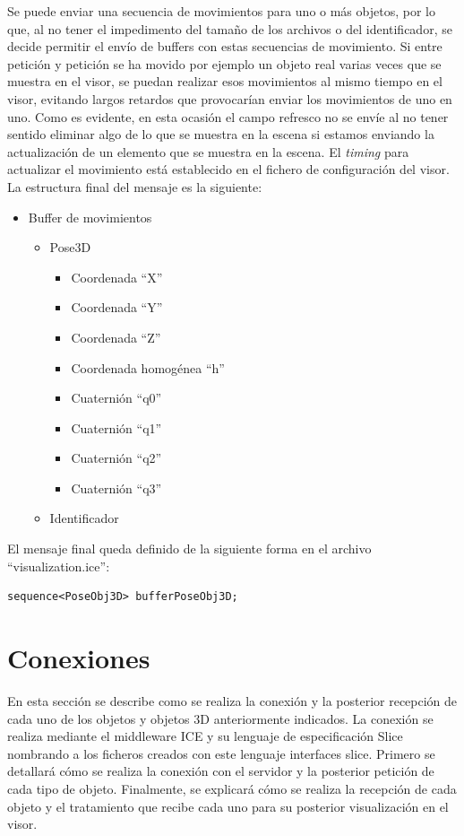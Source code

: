 Se puede enviar una secuencia de movimientos para uno o más objetos, por lo que, al no tener el impedimento del tamaño de los archivos o del identificador, se decide permitir el envío de buffers con estas secuencias de movimiento. Si entre petición y petición se ha movido por ejemplo un objeto real varias veces que se muestra en el visor, se puedan realizar esos movimientos al mismo tiempo en el visor, evitando largos retardos que provocarían enviar los movimientos de uno en uno. Como es evidente, en esta ocasión el campo refresco no se envíe al no tener sentido eliminar algo de lo que se muestra en la escena si estamos enviando la actualización de un elemento que se muestra en la escena. El \textit{timing} para actualizar el movimiento está establecido en el fichero de configuración del visor.
La estructura final del mensaje es la siguiente:
\begin{itemize}
	\item Buffer de movimientos
	\begin{itemize}
		\item	Pose3D
		\begin{itemize}
			\item Coordenada ``X''
			\item Coordenada ``Y''
			\item Coordenada ``Z''
			\item Coordenada homogénea ``h''
			\item Cuaternión ``q0''
			\item Cuaternión ``q1''
			\item Cuaternión ``q2''
			\item Cuaternión ``q3''
		\end{itemize}
		\item Identificador
	\end{itemize}
\end{itemize}

El mensaje final queda definido de la siguiente forma en el archivo ``visualization.ice'':

\begin{lstlisting}[caption= Definición del buffer de movimientos con Slice, label=cod.buffermovslice]
sequence<PoseObj3D> bufferPoseObj3D;
\end{lstlisting}

\section{Conexiones}
En esta sección se describe como se realiza la conexión y la posterior recepción de cada uno de los objetos y objetos 3D anteriormente indicados. La conexión se realiza mediante el middleware ICE y su lenguaje de especificación Slice nombrando a los ficheros creados con este lenguaje interfaces slice. Primero se detallará cómo se realiza la conexión con el servidor y la posterior petición de cada tipo de objeto. Finalmente, se explicará cómo se realiza la recepción de cada objeto y el tratamiento que recibe cada uno para su posterior visualización en el visor.

